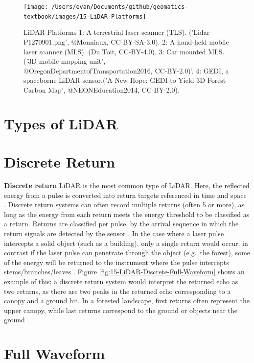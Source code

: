 \documentclass[
]{book}
\begin{document}
\begin{figure}
\texttt{[image: /Users/evan/Documents/github/geomatics-textbook/images/15-LiDAR-Platforms]} \caption{LiDAR Platforms 1: A terrestrial laser scanner (TLS). ('Lidar P1270901.png', @Monniaux, CC-BY-SA-3.0). 2: A hand-held moblie laser scanner (MLS). (Du Toit, CC-BY-4.0). 3: Car mounted MLS. ('3D mobile mapping unit', @OregonDepartmentofTransportation2016, CC-BY-2.0)'. 4: GEDI, a spaceborne LiDAR sensor.('A New Hope: GEDI to Yield 3D Forest Carbon Map', @NEONEducation2014, CC-BY-2.0).}\label{fig:15-LiDAR-Platforms}
\end{figure}

\hypertarget{types-of-lidar}{%
\section{Types of LiDAR}\label{types-of-lidar}}

\hypertarget{discrete-return}{%
\section{Discrete Return}\label{discrete-return}}

\textbf{Discrete return} LiDAR is the most common type of LiDAR. Here, the reflected energy from a pulse is converted into return targets referenced in time and space \citep{White2013}. Discrete return systems can often record multiple returns (often 5 or more), as long as the energy from each return meets the energy threshold to be classified as a return. Returns are classified per pulse, by the arrival sequence in which the return signals are detected by the sensor \citep{UFGeomatics-FortLauderdale2016c}. In the case where a laser pulse intercepts a solid object (such as a building), only a single return would occur; in contrast if the laser pulse can penetrate through the object (e.g.~the forest), some of the energy will be returned to the instrument where the pulse intercepts stems/branches/leaves \citep{White2013}. Figure \ref{fig:15-LiDAR-Discrete-Full-Waveform} shows an example of this; a discrete return system would interpret the returned echo as two returns, as there are two peaks in the returned echo corresponding to a canopy and a ground hit. In a forested landscape, first returns often represent the upper canopy, while last returns correspond to the ground or objects near the ground \citep{White2013}.

\hypertarget{full-waveform}{%
\section{Full Waveform}\label{full-waveform}}
\end{document}
